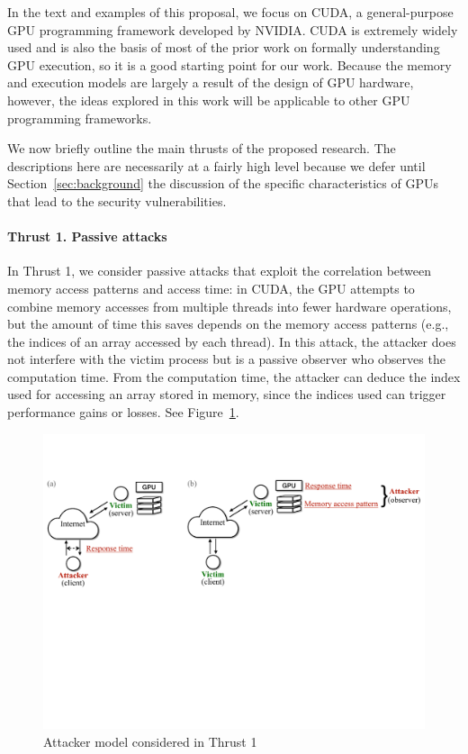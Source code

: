 In the text and examples of this proposal, we focus on CUDA, a general-purpose GPU programming framework developed by NVIDIA.
%
CUDA is extremely widely used and is also the basis of most of the prior work on formally understanding GPU execution, so it is a good starting point for our work.
%
Because the memory and execution models are largely a result of the design of GPU hardware, however, the ideas explored in this work will be applicable to other GPU programming frameworks.

We now briefly outline the main thrusts of the proposed research.
%
The descriptions here are necessarily at a fairly high level because we defer until Section~\ref{sec:background} the discussion of the specific characteristics of GPUs that lead to the security vulnerabilities.

\paragraph{Thrust 1. Passive attacks}
In Thrust 1, we consider passive attacks that exploit the correlation between memory access patterns and access time: in CUDA, the GPU attempts to combine memory accesses from multiple threads into fewer hardware operations, but the amount of time this saves depends on the memory access patterns (e.g., the indices of an array accessed by each thread).
%
In this attack, the attacker does not interfere with the victim process but is a passive observer who observes the computation time. 
%
From the computation time, the attacker can deduce the index used for accessing an array stored in memory, since the indices used can trigger performance gains or losses.
%
See Figure~\ref{fig:th1-attack}.
\begin{figure}[h]
    \includegraphics[clip,trim=0 10cm 0 2cm,width=0.72\pdfpagewidth]{figs/thrust1-fig.pdf}
    \caption{Attacker model considered in Thrust 1 }
    \label{fig:th1-attack}
\end{figure}

